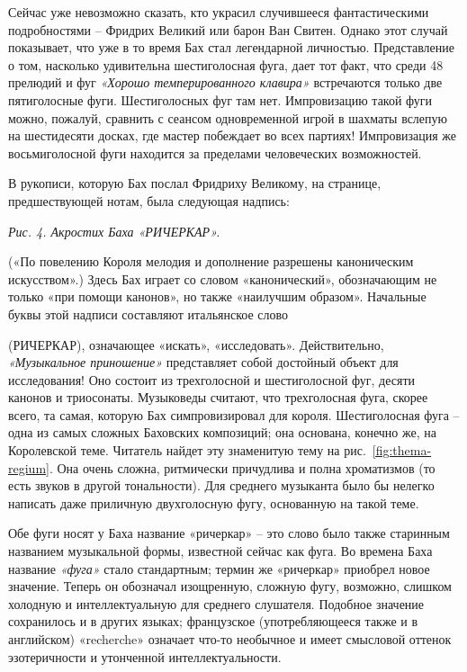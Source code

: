 \documentclass[../main.tex]{subfiles}
\begin{document}
Сейчас уже невозможно сказать, кто украсил случившееся фантастическими подробностями \--- Фридрих Великий или барон Ван Свитен. Однако этот случай показывает, что уже в то время Бах стал легендарной личностью. Представление о том, насколько удивительна шестиголосная фуга, дает тот факт, что среди 48 прелюдий и фуг \emph{«Хорошо темперированного клавира»} встречаются только две пятиголосные фуги. Шестиголосных фуг там нет. Импровизацию такой фуги можно, пожалуй, сравнить с сеансом одновременной игрой в шахматы вслепую на шестидесяти досках, где мастер побеждает во всех партиях! Импровизация же восьмиголосной фуги находится за пределами человеческих возможностей.

В рукописи, которую Бах послал Фридриху Великому, на странице, предшествующей нотам, была следующая надпись:

\emph{Рис. 4. Акростих Баха «РИЧЕРКАР».}

(«По повелению Короля мелодия и дополнение разрешены каноническим искусством».) Здесь Бах играет со словом «канонический», обозначающим не только «при помощи канонов», но также «наилучшим образом». Начальные буквы этой надписи составляют итальянское слово
\begin{center}
\end{center}
(РИЧЕРКАР), означающее «искать», «исследовать». Действительно, \emph{«Музыкальное приношение»} представляет собой достойный объект для исследования! Оно состоит из трехголосной и шестиголосной фуг, десяти канонов и триосонаты. Музыковеды считают, что трехголосная фуга, скорее всего, та самая, которую Бах симпровизировал для короля. Шестиголосная фуга \--- одна из самых сложных Баховских композиций; она основана, конечно же, на Королевской теме. Читатель найдет эту знаменитую тему на рис.~\ref{fig:thema-regium}. Она очень сложна, ритмически причудлива и полна хроматизмов (то есть звуков в другой тональности). Для среднего музыканта было бы нелегко написать даже приличную двухголосную фугу, основанную на такой теме.

Обе фуги носят у Баха название «ричеркар» \--- это слово было также старинным названием музыкальной формы, известной сейчас как фуга. Во времена Баха название \emph{«фуга»} стало стандартным; термин же «ричеркар» приобрел новое значение. Теперь он обозначал изощренную, сложную фугу, возможно, слишком холодную и интеллектуальную для среднего слушателя. Подобное значение сохранилось и в других языках; французское (употребляющееся так­же и в английском) «recherche» означает что-то необычное и имеет смысловой оттенок эзотеричности и утонченной интеллектуальности.
\end{document}
